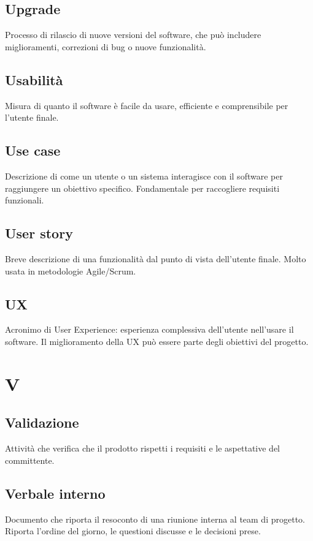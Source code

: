 \documentclass[a4paper,12pt]{article}
\begin{document}
          \subsection*{Upgrade}
			Processo di rilascio di nuove versioni del software, che può includere miglioramenti, correzioni di bug o nuove funzionalità.
          \subsection*{Usabilità}
			Misura di quanto il software è facile da usare, efficiente e comprensibile per l'utente finale.
          \subsection*{Use case}
			Descrizione di come un utente o un sistema interagisce con il software per raggiungere un obiettivo specifico. Fondamentale per raccogliere requisiti funzionali.
          \subsection*{User story}
			Breve descrizione di una funzionalità dal punto di vista dell'utente finale. Molto usata in metodologie Agile/Scrum.
          \subsection*{UX}
			Acronimo di User Experience: esperienza complessiva dell'utente nell'usare il software. Il miglioramento della UX può essere parte degli obiettivi del progetto.
        
\newpage
      
        \section{V}
        
          \subsection*{Validazione}
			Attività che verifica che il prodotto rispetti i requisiti e le aspettative del committente.
          \subsection*{Verbale interno}
			Documento che riporta il resoconto di una riunione interna al team di progetto. Riporta l'ordine del giorno, le questioni discusse e le decisioni prese.
\end{document}
